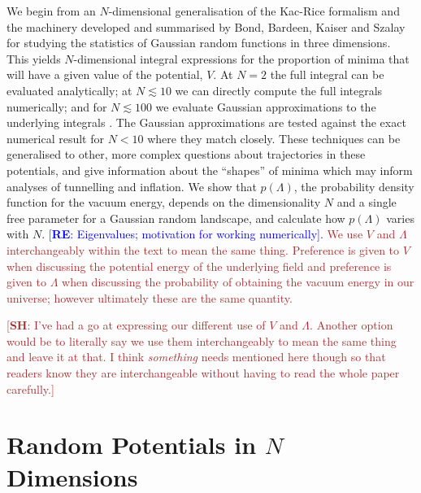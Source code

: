 \documentclass[12pt]{article}
\newcommand{\re}[1]{\textcolor{blue}{[{\bf RE}: #1]}}
\newcommand{\SH}[1]{\textcolor{brown}{[{\bf SH}: #1]}}
\newcommand{\sh}[1]{\textcolor{brown}{#1}}
\begin{document}
 We begin from an $N$-dimensional generalisation of the Kac-Rice formalism \cite{Kac1943,Rice1945} and the  machinery developed and summarised by Bond, Bardeen, Kaiser and Szalay  \cite{BBKS} for studying the statistics of Gaussian random functions in three dimensions. This yields $N$-dimensional integral expressions for the proportion of minima that will have a given value of the potential, $V$. At $N=2$ the full integral can be evaluated analytically; at $N \lesssim 10$ we can directly compute the full integrals numerically; and for $N \lesssim 100$ we evaluate Gaussian approximations to the underlying integrals . The Gaussian approximations are tested against the exact numerical result for $N <10$ where they match closely. These techniques can be generalised to other, more complex questions about trajectories in these potentials, and give information about the ``shapes'' of minima which may inform analyses of tunnelling and inflation. We show that $p(\Lambda)$, the probability density function for the vacuum energy, depends on the dimensionality $N$ and a single free parameter for a Gaussian random landscape, and calculate how $p(\Lambda)$ varies with $N$. \re{Eigenvalues; motivation for working numerically}. \sh{We use $V$ and $\Lambda$ interchangeably within the text to mean the same thing. Preference is given to $V$ when discussing the potential energy of the underlying field and preference is given to $\Lambda$ when discussing the probability of obtaining the vacuum energy in our universe; however ultimately these are the same quantity.}

 \SH{I've had a go at expressing our different use of $V$ and $\Lambda$. Another option would be to literally say we use them interchangeably to mean the same thing and leave it at that. I think \emph{something} needs mentioned here though so that readers know they are interchangeable without having to read the whole paper carefully.}

\section{Random Potentials in $N$ Dimensions}

\end{document}

